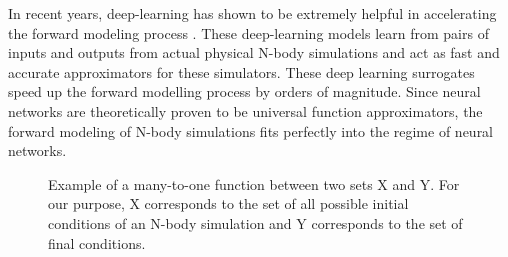\documentclass[11pt]{article}
\begin{document}
In recent years, deep-learning has shown to be extremely helpful in accelerating the forward modeling process \cite{he_li_feng_ho_ravanbakhsh_chen_póczos_2019}. These deep-learning models learn from pairs of inputs and outputs from actual physical N-body simulations and act as fast and accurate approximators for these simulators. These deep learning surrogates speed up the forward modelling process by orders of magnitude. Since neural networks are theoretically proven to be universal function approximators, the forward modeling of N-body simulations fits perfectly into the regime of neural networks.

\begin{figure}
    \caption{Example of a many-to-one function between two sets X and Y. For our purpose, X corresponds to the set of all possible initial conditions of an N-body simulation and Y corresponds to the set of final conditions.}
    \label{manytoone}
\end{figure}
\end{document}
